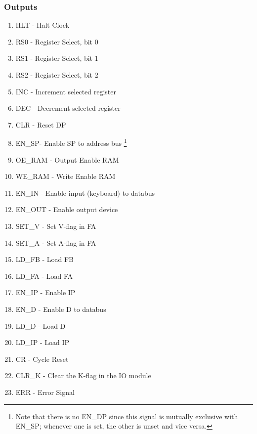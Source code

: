 \subsubsection*{Outputs}
\begin{enumerate}
\itemsep0em 
\item HLT - Halt Clock
\item RS0 - Register Select, bit 0
\item RS1 - Register Select, bit 1
\item RS2 - Register Select, bit 2
\item INC - Increment selected register
\item DEC - Decrement selected register
\item CLR - Reset DP
\item EN\_SP- Enable SP to address bus \footnote{Note that there is no EN\_DP since this signal is mutually exclusive with EN\_SP; whenever one is set, the other is unset and vice versa.}
\item OE\_RAM - Output Enable RAM
\item WE\_RAM - Write Enable RAM
\item EN\_IN - Enable input (keyboard) to databus
\item EN\_OUT - Enable output device
\item SET\_V - Set V-flag in FA
\item SET\_A - Set A-flag in FA
\item LD\_FB - Load FB
\item LD\_FA - Load FA
\item EN\_IP - Enable IP
\item EN\_D - Enable D to databus
\item LD\_D - Load D
\item LD\_IP - Load IP
\item CR - Cycle Reset
\item CLR\_K - Clear the K-flag in the IO module
\item ERR - Error Signal
\end{enumerate}


